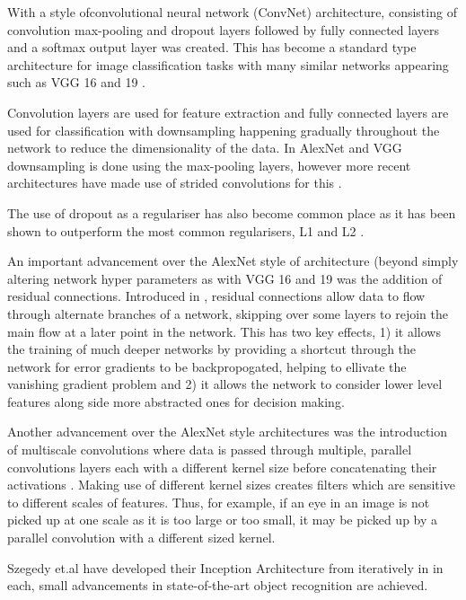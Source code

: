 With \cite{krizhevsky2012imagenet} a style ofconvolutional neural network (ConvNet) architecture, consisting of convolution max-pooling and dropout layers followed by fully connected layers and a softmax output layer was created. This has become a standard type architecture for image classification tasks with many similar networks appearing such as VGG 16 and 19 \cite{simonyan2014very}.

Convolution layers are used for feature extraction and fully connected layers are used for classification with downsampling happening gradually throughout the network to reduce the dimensionality of the data. In AlexNet and VGG downsampling is done using the max-pooling layers, however more recent architectures have made use of strided convolutions for this \cite{springenberg2014striving}.

The use of dropout as a regulariser has also become common place as it has been shown to outperform the most common regularisers, L1 and L2 \cite{srivastava2014dropout}.

An important advancement over the AlexNet style of architecture (beyond simply altering network hyper parameters as with VGG 16 and 19 \cite{simonyan2014very} was the addition of residual connections. Introduced in \cite{he2016deep}, residual connections allow data to flow through alternate branches of a network, skipping over some layers to rejoin the main flow at a later point in the network. This has two key effects, 1) it allows the training of much deeper networks by providing a shortcut through the network for error gradients to be backpropogated, helping to ellivate the vanishing gradient problem \cite{hochreiter1998vanishing} and 2) it allows the network to consider lower level features along side more abstracted ones for decision making.

Another advancement over the AlexNet style architectures was the introduction of multiscale convolutions where data is passed through multiple, parallel convolutions layers each with a different kernel size before concatenating their activations \cite{szegedy2015going}. Making use of different kernel sizes creates filters which are sensitive to different scales of features. Thus, for example, if an eye in an image is not picked up at one scale as it is too large or too small, it may be picked up by a parallel convolution with a different sized kernel.

Szegedy et.al have developed their Inception Architecture from \cite{szegedy2015going} iteratively in \cite{szegedy2016rethinking, szegedy2017inception} in each, small advancements in state-of-the-art object recognition are achieved.



